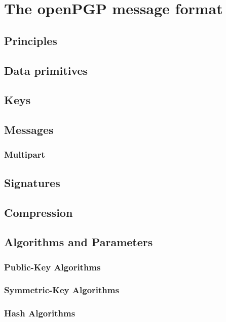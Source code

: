 \chapter{The openPGP message format}

\section{Principles}

\section{Data primitives}

\section{Keys}

\section{Messages}

\subsection{Multipart}

\section{Signatures}

\section{Compression}

\section{Algorithms and Parameters}


\subsection{Public-Key Algorithms}

\subsection{Symmetric-Key Algorithms}

\subsection{Hash Algorithms}

